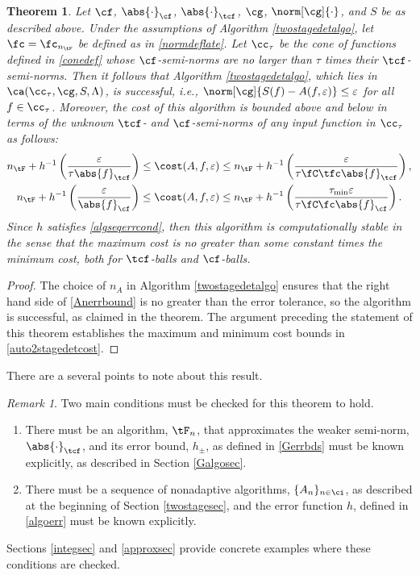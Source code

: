 \documentclass[]{elsarticle}
\newtheorem{theorem}{Theorem}
\theoremstyle{definition}
\theoremstyle{remark}
\newtheorem{rem}{Remark}
\newcommand{\Fnorm}[1]{\abs{#1}_{\cf}}
\newcommand{\Ftnorm}[1]{\abs{#1}_{\tcf}}
\newcommand{\Gnorm}[1]{\norm[\cg]{#1}}
\begin{document}
\begin{theorem}  \label{TwoStageDetermThm}  Let $\cf$, $\Fnorm{\cdot}$, $\Ftnorm{\cdot}$, $\cg$, $\Gnorm{\cdot}$, and $S$ be as described above.  Under the assumptions of Algorithm  \ref{twostagedetalgo}, let $\fc=\fc_{n_{\tF}}$ be defined as in \eqref{normdeflate}.
Let $\cc_\tau$ be the cone of functions defined in \eqref{conedef} whose $\cf$-semi-norms are no larger than $\tau$ times their $\tcf$-semi-norms.  Then it follows that Algorithm \ref{twostagedetalgo}, which lies in $\ca(\cc_{\tau},\cg,S,\Lambda)$, is successful,  i.e.,  $\norm[\cg]{S(f)-A(f,\varepsilon)} \le \varepsilon$ for all $f \in \cc_\tau$.  Moreover, the cost of this algorithm is bounded above and below in terms of the unknown $\tcf$- and $\cf$-semi-norms of any input function in $\cc_{\tau}$ as follows:
\begin{subequations}  \label{auto2stagedetcost}
\begin{gather}
n_{\tF}+ h^{-1}\left(\frac{\varepsilon}{\tau \Ftnorm{f}} \right) \le 
\cost(A,f,\varepsilon)
\le n_{\tF}+ h^{-1}\left(\frac{\varepsilon}{\tau \fC\tfc\Ftnorm{f}}\right), \\
n_{\tF}+ h^{-1}\left(\frac{\varepsilon}{\Fnorm{f}} \right) \le \cost(A,f,\varepsilon)
\le n_{\tF}+h^{-1}\left(\frac{\tau_{\min}\varepsilon}{\tau \fC\fc\Fnorm{f}}\right).
\end{gather}
\end{subequations}
Since $h$ satisfies \eqref{algseqerrcond}, then this algorithm is computationally stable in the sense that the maximum cost is no greater than some constant times the minimum cost, both for $\tcf$-balls and $\cf$-balls.
\end{theorem}

\begin{proof} The choice of $n_A$ in Algorithm \ref{twostagedetalgo} ensures that the right hand side of \eqref{Anerrbound} is no greater than the error tolerance, so the algorithm is successful, as claimed in the theorem.  The argument preceding the statement of this theorem establishes the maximum and minimum cost bounds in \eqref{auto2stagedetcost}. 
\end{proof}

There are a several points to note about this result.

\begin{rem} Two main conditions must be checked for this theorem to hold.
\begin{enumerate}
\renewcommand{\labelenumi}{\roman{enumi}.}
\item There must be an algorithm, $\tF_n$, that approximates the weaker semi-norm,  $\Ftnorm{\cdot}$, and its error bound, $h_{\pm}$, as defined in \eqref{Gerrbds} must be known explicitly, as described in Section \ref{Galgosec}.
\item There must be a  sequence of nonadaptive algorithms, $\{A_n\}_{n \in \ci}$, as described at the beginning of  Section \ref{twostagesec}, and the error function $h$, defined in \eqref{algoerr} must be known explicitly.  
\end{enumerate}
Sections \ref{integsec} and \ref{approxsec} provide concrete examples where these conditions are checked.
\end{rem}
\end{document}
